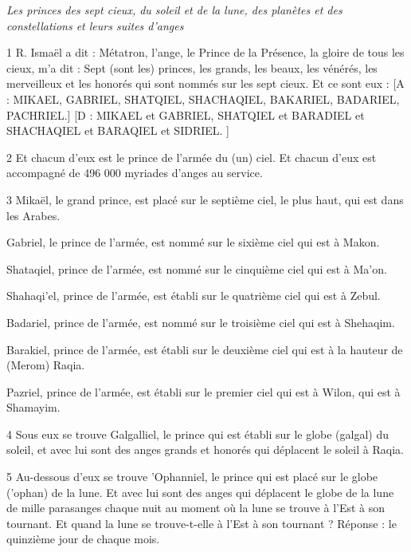 
\par \textit{Les princes des sept cieux, du soleil et de la lune, des planètes et des constellations et leurs suites d'anges}

\par 1 R. Ismaël a dit : Métatron, l'ange, le Prince de la Présence, la gloire de tous les cieux, m'a dit : Sept (sont les) princes, les grands, les beaux, les vénérés, les merveilleux et les honorés qui sont nommés sur les sept cieux. Et ce sont eux : [A : MIKAEL, GABRIEL, SHATQIEL, SHACHAQIEL, BAKARIEL, BADARIEL, PACHRIEL.] [D : MIKAEL et GABRIEL, SHATQIEL et BARADIEL et SHACHAQIEL et BARAQIEL et SIDRIEL. ]

\par 2 Et chacun d'eux est le prince de l'armée du (un) ciel. Et chacun d’eux est accompagné de 496 000 myriades d’anges au service.

\par 3 Mikaël, le grand prince, est placé sur le septième ciel, le plus haut, qui est dans les Arabes.

\par Gabriel, le prince de l'armée, est nommé sur le sixième ciel qui est à Makon.

\par Shataqiel, prince de l'armée, est nommé sur le cinquième ciel qui est à Ma'on.

\par Shahaqi'el, prince de l'armée, est établi sur le quatrième ciel qui est à Zebul.

\par Badariel, prince de l'armée, est nommé sur le troisième ciel qui est à Shehaqim.

\par Barakiel, prince de l'armée, est établi sur le deuxième ciel qui est à la hauteur de (Merom) Raqia.

\par Pazriel, prince de l'armée, est établi sur le premier ciel qui est à Wilon, qui est à Shamayim.

\par 4 Sous eux se trouve Galgalliel, le prince qui est établi sur le globe (galgal) du soleil, et avec lui sont des anges grands et honorés qui déplacent le soleil à Raqia.

\par 5 Au-dessous d'eux se trouve 'Ophanniel, le prince qui est placé sur le globe ('ophan) de la lune. Et avec lui sont des anges qui déplacent le globe de la lune de mille parasanges chaque nuit au moment où la lune se trouve à l'Est à son tournant. Et quand la lune se trouve-t-elle à l’Est à son tournant ? Réponse : le quinzième jour de chaque mois.

